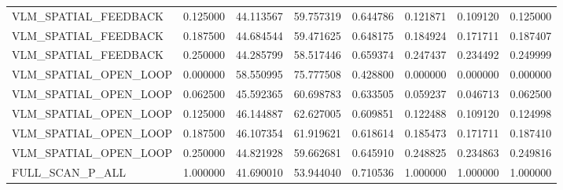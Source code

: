 \begin{tabular}{llllllll}
VLM\_SPATIAL\_FEEDBACK & 0.125000 & 44.113567 & 59.757319 & 0.644786 & 0.121871 & 0.109120 & 0.125000 \\
VLM\_SPATIAL\_FEEDBACK & 0.187500 & 44.684544 & 59.471625 & 0.648175 & 0.184924 & 0.171711 & 0.187407 \\
VLM\_SPATIAL\_FEEDBACK & 0.250000 & 44.285799 & 58.517446 & 0.659374 & 0.247437 & 0.234492 & 0.249999 \\
VLM\_SPATIAL\_OPEN\_LOOP & 0.000000 & 58.550995 & 75.777508 & 0.428800 & 0.000000 & 0.000000 & 0.000000 \\
VLM\_SPATIAL\_OPEN\_LOOP & 0.062500 & 45.592365 & 60.698783 & 0.633505 & 0.059237 & 0.046713 & 0.062500 \\
VLM\_SPATIAL\_OPEN\_LOOP & 0.125000 & 46.144887 & 62.627005 & 0.609851 & 0.122488 & 0.109120 & 0.124998 \\
VLM\_SPATIAL\_OPEN\_LOOP & 0.187500 & 46.107354 & 61.919621 & 0.618614 & 0.185473 & 0.171711 & 0.187410 \\
VLM\_SPATIAL\_OPEN\_LOOP & 0.250000 & 44.821928 & 59.662681 & 0.645910 & 0.248825 & 0.234863 & 0.249816 \\
FULL\_SCAN\_P\_ALL & 1.000000 & 41.690010 & 53.944040 & 0.710536 & 1.000000 & 1.000000 & 1.000000 \\
\hline
\end{tabular}
